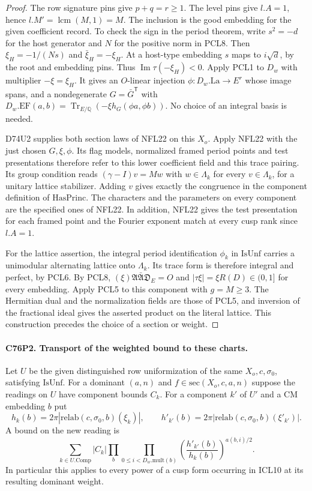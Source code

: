 \begin{proof}
The row signature pins give $p+q=r\ge1$. The level pins give
$l.A=1$, hence $l.M'=\operatorname{lcm}(M,1)=M$.
The inclusion is the good embedding for the given coefficient
record. To check the sign in the period theorem, write $s^2=-d$
for the host generator and $N$ for the positive norm in PCL8.
Then $\xi_H=-1/(Ns)$ and $\bar\xi_H=-\xi_H$.
At a host-type embedding $s$ maps to $i\sqrt d$, by the root and
embedding pins. Thus $\operatorname{Im}\tau(-\xi_H)<0$.
Apply PCL1 to $D_w$ with multiplier $-\xi=\xi_H$.
It gives an $O$-linear injection $\phi:D_w.\mathrm{La}\to E^r$
whose image spans, and a nondegenerate $G=\bar G^{\mathsf T}$
with $D_w.\mathrm{EF}(a,b)=
\operatorname{Tr}_{E/\mathbb Q}(-\xi h_G(\phi a,\phi b))$.
No choice of an integral basis is needed.

D74U2 supplies both section laws of NFL22 on this $X_o$.
Apply NFL22 with the just chosen $G,\xi,\phi$. Its flag models,
normalized framed period points and test presentations therefore
refer to this lower coefficient field and this trace pairing.
Its group condition reads $(\gamma-I)v=Mw$ with $w\in\Lambda_k$
for every $v\in\Lambda_k$, for a unitary lattice stabilizer.
Adding $v$ gives exactly the congruence in the component definition
of $\mathrm{HasPrinc}$. The characters and the parameters on every
component are the specified ones of NFL22. In addition, NFL22 gives
the test presentation for each framed point and the Fourier exponent
match at every cusp rank since $l.A=1$.

For the lattice assertion, the integral period identification
$\phi_k$ in $\mathrm{IsUnf}$ carries a unimodular alternating
lattice onto $\Lambda_k$. Its trace form is therefore integral
and perfect, by PCL6. By PCL8,
$(\xi)\mathfrak A\bar{\mathfrak A}\mathfrak D_E=O$ and
$|\tau\xi|=\xi R(D)\in(0,1]$ for every embedding. Apply PCL5
to this component with $g=M\ge3$. The Hermitian dual and the
normalization fields are those of PCL5, and inversion of the
fractional ideal gives the asserted product on the literal lattice.
This construction precedes the choice of a section or weight.
\end{proof}

\paragraph{C76P2. Transport of the weighted bound to these charts.}
Let $U$ be the given distinguished row uniformization of the same
$X_o,c,\sigma_0$, satisfying $\mathrm{IsUnf}$. For a dominant
$(a,n)$ and $f\in\mathrm{sec}(X_o,c,a,n)$ suppose the readings
on $U$ have component bounds $C_k$. For a component $k'$ of $U'$
and a CM embedding $b$ put
\[
 h_k(b)=2\pi|\mathrm{relab}(c,\sigma_0,b)(\xi_k)|,\qquad
 h'_{k'}(b)=2\pi|\mathrm{relab}(c,\sigma_0,b)(\xi'_{k'})|.
\]
A bound on the new reading is
\[
 \sum_{k\in U.\mathrm{Comp}}|C_k|
 \prod_b\prod_{0\le i<D_w.\mathrm{mult}(b)}
       \left(\frac{h'_{k'}(b)}{h_k(b)}\right)^{a(b,i)/2}.
\]
In particular this applies to every power of a cusp form occurring in
ICL10 at its resulting dominant weight.

